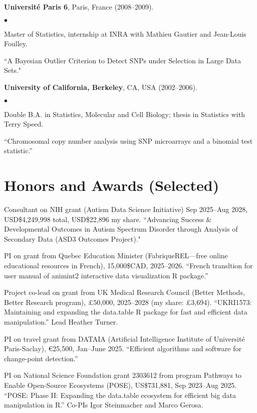 \documentclass[margin,line]{res}
\newenvironment{list2}{
  \begin{list}{$\bullet$}{%
      \setlength{\itemsep}{0in}
      \setlength{\parsep}{0in} \setlength{\parskip}{0in}
      \setlength{\topsep}{0in} \setlength{\partopsep}{0in} 
      \setlength{\leftmargin}{0.2in}}}{\end{list}}
\begin{document}
\begin{resume}
{\bf Universit\'e Paris 6}, Paris, France (2008--2009).\\
\vspace*{-.1in}
\begin{list2}
\item[] Master of Statistics, internship at INRA with Mathieu Gautier and Jean-Louis Foulley.
\item[] ``A Bayesian Outlier Criterion to Detect SNPs under Selection in Large Data Sets."
\end{list2}

{\bf University of California, Berkeley}, CA, USA (2002--2006).\\
\vspace*{-.1in}
\begin{list2}
\item[] Double B.A. in Statistics, Molecular and Cell Biology; thesis in Statistics with Terry Speed.
\item[] ``Chromosomal copy number analysis using SNP microarrays and a binomial test statistic.'' 
\end{list2}

\section{\sc Honors and Awards (Selected)}

Consultant on NIH grant (Autism Data Science Initiative) Sep 2025--Aug 2028, USD\$4,249,998 total, USD\$22,896 my share. ``Advancing Success \& Developmental Outcomes in Autism Spectrum Disorder through Analysis of Secondary Data (ASD3 Outcomes Project)."

PI on grant from Quebec Education Minister (FabriqueREL---free online
educational resources in French), 15,000\$CAD, 2025--2026. ``French
transltion for user manual of animint2 interactive data visualization
R package.''

Project co-lead on grant from UK Medical Research Council (Better
Methods, Better Research program), £50,000, 2025--2028 (my share:
£3,694). ``UKRI1573: Maintaining and expanding the data.table R
package for fast and efficient data manipulation.'' Lead Heather
Turner.

PI on travel grant from DATAIA (Artificial Intelligence Institute of
Université Paris-Saclay), €25,500, Jan--June 2025. ``Efficient algorithms and software for change-point detection.''

PI on National Science Foundation grant 2303612 from program Pathways to Enable Open-Source Ecosystems (POSE), US\$731,881, Sep
2023--Aug 2025. ``POSE: Phase II: Expanding the data.table ecosystem
for efficient big data manipulation in R.'' Co-PIs Igor Steinmacher
and Marco Gerosa.


\end{resume}
\end{document}
